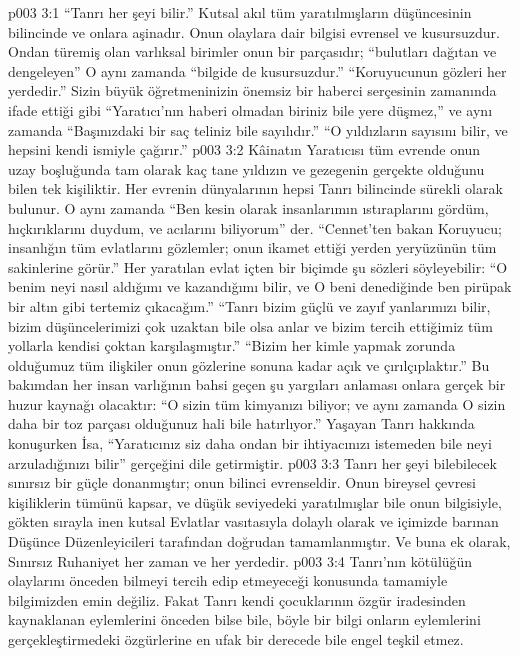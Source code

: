 \vs p003 3:1 “Tanrı her şeyi bilir.” Kutsal akıl tüm yaratılmışların düşüncesinin bilincinde ve onlara aşinadır. Onun olaylara dair bilgisi evrensel ve kusursuzdur. Ondan türemiş olan varlıksal birimler onun bir parçasıdır; “bulutları dağıtan ve dengeleyen” O aynı zamanda “bilgide de kusursuzdur.” “Koruyucunun gözleri her yerdedir.” Sizin büyük öğretmeninizin önemsiz bir haberci serçesinin zamanında ifade ettiği gibi “Yaratıcı’nın haberi olmadan biriniz bile yere düşmez,” ve aynı zamanda “Başınızdaki bir saç teliniz bile sayılıdır.” “O yıldızların sayısını bilir, ve hepsini kendi ismiyle çağırır.”
\vs p003 3:2 Kâinatın Yaratıcısı tüm evrende onun uzay boşluğunda tam olarak kaç tane yıldızın ve gezegenin gerçekte olduğunu bilen tek kişiliktir. Her evrenin dünyalarının hepsi Tanrı bilincinde sürekli olarak bulunur. O aynı zamanda “Ben kesin olarak insanlarımın ıstıraplarını gördüm, hıçkırıklarını duydum, ve acılarını biliyorum” der. “Cennet’ten bakan Koruyucu; insanlığın tüm evlatlarını gözlemler; onun ikamet ettiği yerden yeryüzünün tüm sakinlerine görür.” Her yaratılan evlat içten bir biçimde şu sözleri söyleyebilir: “O benim neyi nasıl aldığımı ve kazandığımı bilir, ve O beni denediğinde ben pirüpak bir altın gibi tertemiz çıkacağım.” “Tanrı bizim güçlü ve zayıf yanlarımızı bilir, bizim düşüncelerimizi çok uzaktan bile olsa anlar ve bizim tercih ettiğimiz tüm yollarla kendisi çoktan karşılaşmıştır.” “Bizim her kimle yapmak zorunda olduğumuz tüm ilişkiler onun gözlerine sonuna kadar açık ve çırılçıplaktır.” Bu bakımdan her insan varlığının bahsi geçen şu yargıları anlaması onlara gerçek bir huzur kaynağı olacaktır: “O sizin tüm kimyanızı biliyor; ve aynı zamanda O sizin daha bir toz parçası olduğunuz hali bile hatırlıyor.” Yaşayan Tanrı hakkında konuşurken İsa, “Yaratıcınız siz daha ondan bir ihtiyacınızı istemeden bile neyi arzuladığınızı bilir” gerçeğini dile getirmiştir.
\vs p003 3:3 Tanrı her şeyi bilebilecek sınırsız bir güçle donanmıştır; onun bilinci evrenseldir. Onun bireysel çevresi kişiliklerin tümünü kapsar, ve düşük seviyedeki yaratılmışlar bile onun bilgisiyle, gökten sırayla inen kutsal Evlatlar vasıtasıyla dolaylı olarak ve içimizde barınan Düşünce Düzenleyicileri tarafından doğrudan tamamlanmıştır. Ve buna ek olarak, Sınırsız Ruhaniyet her zaman ve her yerdedir.
\vs p003 3:4 Tanrı’nın kötülüğün olaylarını önceden bilmeyi tercih edip etmeyeceği konusunda tamamiyle bilgimizden emin değiliz. Fakat Tanrı kendi çocuklarının özgür iradesinden kaynaklanan eylemlerini önceden bilse bile, böyle bir bilgi onların eylemlerini gerçekleştirmedeki özgürlerine en ufak bir derecede bile engel teşkil etmez.
